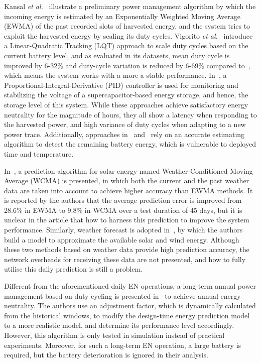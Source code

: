 Kansal \textit{et al.}~\cite{kansal2007power} illustrate a preliminary power management algorithm by which the incoming energy is estimated by an Exponentially Weighted Moving Average (EWMA) of the past recorded slots of harvested energy, and the system tries to exploit the harvested energy by scaling its duty cycles. Vigorito \textit{et al.}~\cite{vigorito2007adaptive} introduce a Linear-Quadratic Tracking (LQT) approach to scale duty cycles based on the current battery level, and as evaluated in its datasets, mean duty cycle is improved by 6-32\% and duty-cycle variation is reduced by 6-69\% compared to~\cite{kansal2007power}, which means the system works with a more a stable performance. In~\cite{le2012power}, a Proportional-Integral-Derivative (PID) controller is used for monitoring and stabilizing the voltage of a supercapacitor-based energy storage, and hence, the storage level of this system. While these approaches achieve satisfactory energy neutrality for the magnitude of hours, they all show a latency when responding to the harvested power, and high variance of duty cycles when adapting to a new power trace. Additionally, approaches in~\cite{vigorito2007adaptive} and~\cite{kansal2007power} rely on an accurate estimating algorithm to detect the remaining battery energy, which is vulnerable to deployed time and temperature. 

In~\cite{piorno2009prediction}, a prediction algorithm for solar energy named Weather-Conditioned Moving Average (WCMA) is presented, in which both the current and the past weather data are taken into account to achieve higher accuracy than EWMA methods. It is reported by the authors that the average prediction error is improved from 28.6\% in EWMA to 9.8\% in WCMA over a test duration of 45 days, but it is unclear in the article that how to harness this prediction to improve the system performance. Similarly, weather forecast is adopted in~\cite{sharma2010cloudy}, by which the authors build a model to approximate the available solar and wind energy. Although these two methods based on weather data provide high prediction accuracy, the network overheads for receiving these data are not presented, and how to fully utilise this daily prediction is still a problem.

Different from the aforementioned daily EN operations, a long-term annual power management based on duty-cycling is presented in~\cite{buchli2014dynamic} to achieve annual energy neutrality. The authors use an adjustment factor, which is dynamically calculated from the historical windows, to modify the design-time energy prediction model to a more realistic model, and determine its performance level accordingly. However, this algorithm is only tested in simulation instead of practical experiments. Moreover, for such a long-term EN operation, a large battery is required, but the battery deterioration is ignored in their analysis.

